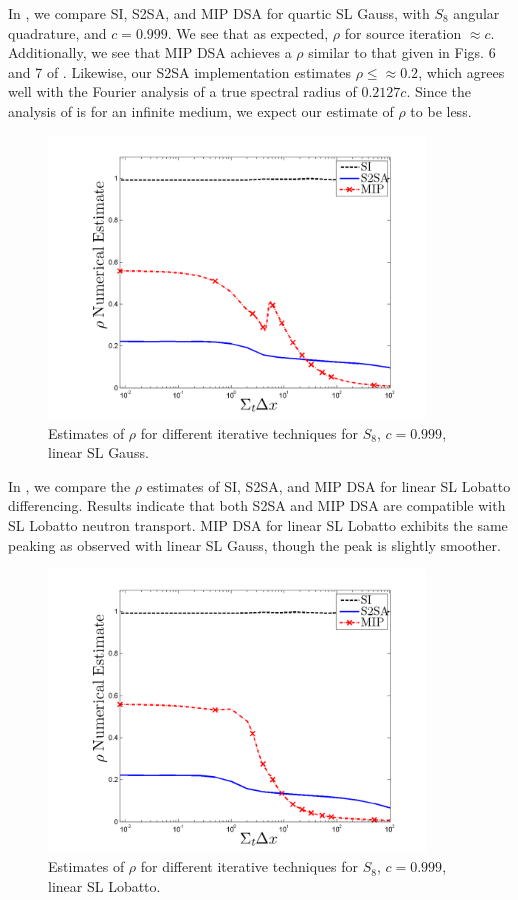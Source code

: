 In , we compare SI, S2SA, and MIP DSA for quartic SL Gauss, with $S_8$ angular quadrature, and $c=0.999$.
We see that as expected\cite{larsen_dsa}, $\rho$ for source iteration $\approx c$.  
Additionally, we see that MIP DSA achieves a $\rho$ similar to that given in Figs. 6 and 7 of \cite{mip_dsa}.
Likewise, our S2SA implementation estimates $\rho \leq \approx 0.2$, which agrees well with the Fourier analysis of \cite{s2sa} a true spectral radius of $0.2127c$.  Since the analysis of \cite{s2sa} is for an infinite medium, we expect our estimate of $\rho$ to be less.
\begin{figure}[!hbp]
\centering
\includegraphics[width=10cm]{chapter4_acceleration/Constant_XS_SN8_P1_Gauss_Solvers.png}
\caption{Estimates of $\rho$ for different iterative techniques for $S_8$, $c=0.999$, linear SL Gauss.}
\label{fig:p1_gauss}
\end{figure}
In , we compare the $\rho$ estimates of SI, S2SA, and MIP DSA for linear SL Lobatto differencing.  Results indicate that both S2SA and MIP DSA are compatible with SL Lobatto neutron transport.
MIP DSA for linear SL Lobatto exhibits the same peaking as observed with linear SL Gauss, though the peak is slightly smoother. 
\begin{figure}[!htp]
\centering
\includegraphics[width=10cm]{chapter4_acceleration/Constant_XS_SN8_P1_Lobatto_Solvers.png}
\caption{Estimates of $\rho$ for different iterative techniques for $S_8$, $c=0.999$, linear SL Lobatto.}
\label{fig:p1_lobatto}
\end{figure}
